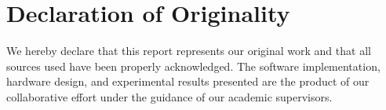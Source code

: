 \documentclass[12pt,a4paper]{article}
\begin{document}
\vspace{1cm}

\section*{Declaration of Originality}

We hereby declare that this report represents our original work and that all sources used have been properly acknowledged. The software implementation, hardware design, and experimental results presented are the product of our collaborative effort under the guidance of our academic supervisors.
\end{document}
